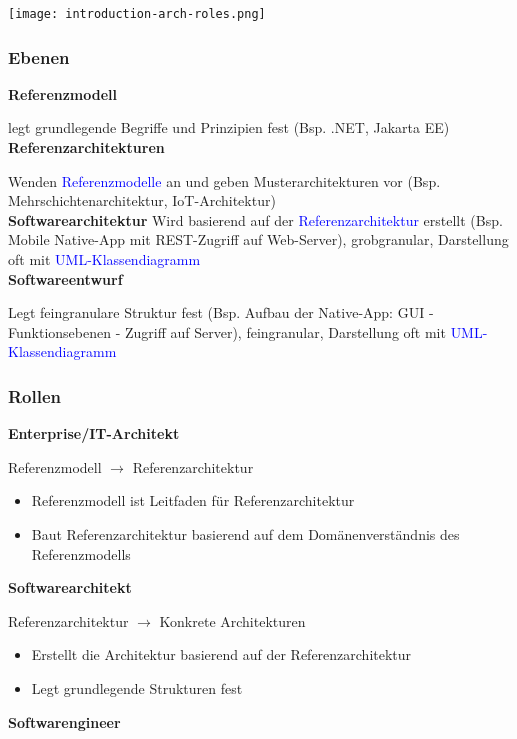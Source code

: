 \texttt{[image: introduction-arch-roles.png]}

\subsubsection{Ebenen}

\textbf{Referenzmodell}

legt grundlegende Begriffe und Prinzipien fest (Bsp. .NET, Jakarta EE) \\

\textbf{Referenzarchitekturen}

Wenden \textcolor{blue}{Referenzmodelle} an und geben Musterarchitekturen vor (Bsp. Mehrschichtenarchitektur, IoT-Architektur) \\

\textbf{Softwarearchitektur} Wird basierend auf der
\textcolor{blue}{Referenzarchitektur} erstellt (Bsp. Mobile Native-App mit REST-Zugriff auf Web-Server), grobgranular, Darstellung oft mit \textcolor{blue}{UML-Klassendiagramm} \\

\textbf{Softwareentwurf}

Legt feingranulare Struktur fest (Bsp. Aufbau der Native-App: GUI - Funktionsebenen - Zugriff auf Server), feingranular, Darstellung oft mit \textcolor{blue}{UML-Klassendiagramm}

\subsubsection{Rollen}
\textbf{Enterprise/IT-Architekt}

Referenzmodell $\rightarrow$ Referenzarchitektur

\begin{itemize}
    \item Referenzmodell ist Leitfaden für Referenzarchitektur
    \item Baut Referenzarchitektur basierend auf dem Domänenverständnis des Referenzmodells
\end{itemize}
\vspace{10pt}
\textbf{Softwarearchitekt}

Referenzarchitektur $\rightarrow$ Konkrete Architekturen

\begin{itemize}
    \item Erstellt die Architektur basierend auf der Referenzarchitektur
    \item Legt grundlegende Strukturen fest
\end{itemize}
\vspace{10pt}
\textbf{Softwarengineer}

